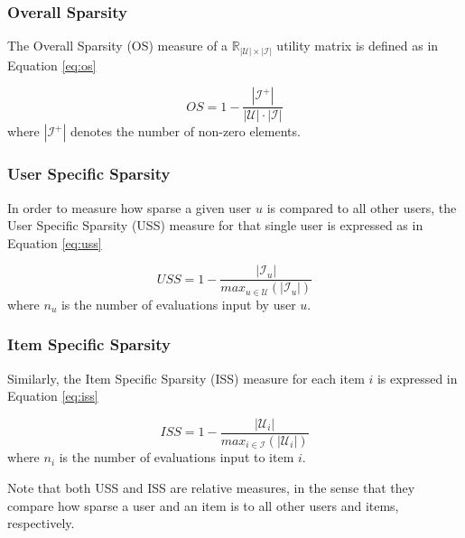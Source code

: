     \subsubsection{Overall Sparsity} 

		The Overall Sparsity (OS)  measure of a $\mathbb{R}_{|\mathcal{U}| \times |\mathcal{I}|}$ utility matrix is defined as in Equation \ref{eq:os}
	
		\begin{equation}
			\label{eq:os}
			OS = 1 - \frac{|\mathcal{I}^+|}{|\mathcal{U}| \cdot |\mathcal{I}|}	 
		\end{equation} where $|\mathcal{I}^+|$ denotes the number of non-zero elements. 

	\subsubsection{User Specific Sparsity}
	
	In order to measure how sparse a given user $u$ is compared to all other users, the User Specific Sparsity (USS)  measure for that single user is expressed as in Equation  \ref{eq:uss}

	\begin{equation}
		\label{eq:uss}
		USS = 1 - \frac{|\mathcal{I}_u|}{max_{u \in \mathcal{U}} (|\mathcal{I}_u|)}
	\end{equation} where $n_u$ is the number of evaluations input by user $u$. 
	
	\subsubsection{Item Specific Sparsity}
	
	Similarly, the Item Specific Sparsity (ISS)  measure for each item $i$ is expressed in Equation \ref{eq:iss}
	
	\begin{equation}
	    \label{eq:iss}
	    ISS = 1 - \frac{|\mathcal{U}_i|}{max_{i \in \mathcal{I}} (|\mathcal{U}_i|)}
	\end{equation} where $n_i$ is the number of evaluations input to item $i$.
	
	Note that both USS and ISS are relative measures, in the sense that they compare how sparse a user and an item is to all other users and items, respectively.
	
